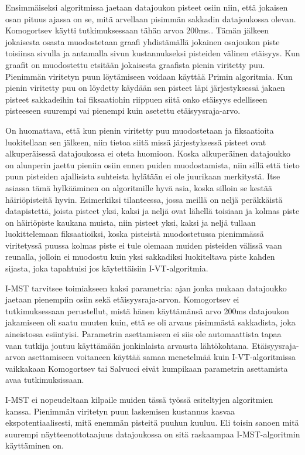 Ensimmäiseksi algoritmissa jaetaan datajoukon pisteet osiin niin, että jokaisen osan pituus ajassa on se, mitä arvellaan pisimmän sakkadin datajoukossa olevan. Komogortsev käytti tutkimuksessaan tähän arvoa 200ms.\citep[s. 3 ]{komogortsev2010}. Tämän jälkeen jokaisesta osasta muodostetaan graafi yhdistämällä jokainen osajoukon piste toisiinsa sivulla ja antamalla sivun kustannukseksi pisteiden välinen etäisyys. Kun graafit on muodostettu etsitään jokaisesta graafista pienin viritetty puu. Pienimmän viritetyn puun löytämiseen voidaan käyttää Primin algoritmia.\citep[s. 75]{salvucci2000} Kun pienin viritetty puu on löydetty käydään sen pisteet läpi järjestyksessä jakaen pisteet sakkadeihin tai fiksaatiohin riippuen siitä onko etäisyys edelliseen pisteeseen suurempi vai pienempi kuin asetettu etäisyysraja-arvo.

On huomattava, että kun pienin viritetty puu muodostetaan ja fiksaatioita luokitellaan sen jälkeen, niin tietoa siitä missä järjestyksessä pisteet ovat alkuperäisessä datajoukossa ei oteta huomioon. Koska alkuperäinen datajoukko on alunperin jaettu pieniin osiin ennen puiden muodostamista, niin sillä että tieto puun pisteiden ajallisista suhteista hylätään ei ole juurikaan merkitystä. Itse asiassa tämä hylkääminen on algoritmille hyvä asia, koska silloin se kestää häiriöpisteitä hyvin. Esimerkiksi tilanteessa, jossa meillä on neljä peräkkäistä datapistettä, joista pisteet yksi, kaksi ja neljä ovat lähellä toisiaan ja kolmas piste on häiriöpiste kaukana muista, niin pisteet yksi, kaksi ja neljä tullaan luokittelemaan fiksaatioiksi, koska pisteistä muodostetussa pienimmässä viritetyssä puussa kolmas piste ei tule olemaan muiden pisteiden välissä vaan reunalla, jolloin ei muodostu kuin yksi sakkadiksi luokiteltava piste kahden sijasta, joka tapahtuisi jos käytettäisiin I-VT-algoritmia.

I-MST tarvitsee toimiakseen kaksi parametria: ajan jonka mukaan datajoukko jaetaan pienempiin osiin sekä etäisyysraja-arvon. Komogortsev ei tutkimuksessaan perustellut, mistä hänen käyttämänsä arvo 200ms datajoukon jakamiseen oli saatu muuten kuin, että se oli arvaus pisimmästä sakkadista, joka aineistossa esiintyisi. Parametrin asettamiseen ei siis ole automaattista tapaa vaan tutkija joutuu käyttämään jonkinlaista arvausta lähtökohtana. Etäisyysraja-arvon asettamiseen voitaneen käyttää samaa menetelmää kuin I-VT-algoritmissa vaikkakaan Komogortsev tai Salvucci eivät kumpikaan parametrin asettamista avaa tutkimuksissaan.

I-MST ei nopeudeltaan kilpaile muiden tässä työssä esiteltyjen algoritmien kanssa. Pienimmän viritetyn puun laskemisen kustannus kasvaa ekspotentiaalisesti, mitä enemmän pisteitä puuhun kuuluu. Eli toisin sanoen mitä suurempi näytteenottotaajuus datajoukossa on sitä raskaampaa I-MST-algoritmin käyttäminen on. 

